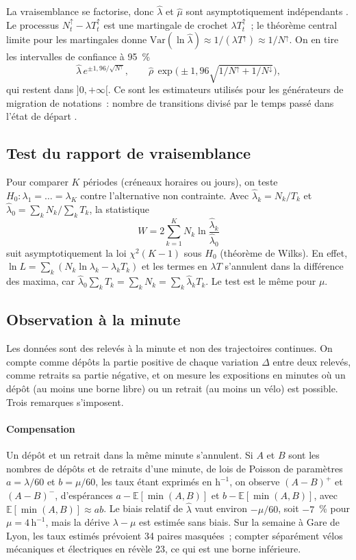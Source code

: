 \documentclass[10pt,a4paper,twocolumn]{article}
\theoremstyle{enonce}
\theoremstyle{defi}
\newcommand{\EE}{\mathbb{E}}
\newcommand{\hr}{\,\mathrm{h}^{-1}}
\newcommand{\Nu}{N^{\uparrow}}
\newcommand{\Nd}{N^{\downarrow}}
\newcommand{\Tu}{T^{\uparrow}}
\begin{document}
La vraisemblance se factorise, donc $\hat\lambda$ et $\hat\mu$ sont asymptotiquement indépendants \cite{Alb62,Bil61}. Le processus $\Nu_t-\lambda\Tu_t$ est une martingale de crochet $\lambda\Tu_t$~; le théorème central limite pour les martingales donne $\mathrm{Var}(\ln\hat\lambda)\approx1/(\lambda\Tu)\approx1/\Nu$. On en tire les intervalles de confiance à 95~\%
\[
\hat\lambda\,e^{\pm1{,}96/\sqrt{\Nu}},\qquad\hat\rho\,\exp\Big(\pm1{,}96\sqrt{1/\Nu+1/\Nd}\Big),
\]
qui restent dans $]0,+\infty[$. Ce sont les estimateurs utilisés pour les générateurs de migration de notations~: nombre de transitions divisé par le temps passé dans l'état de départ \cite{LS02}.

\subsection{Test du rapport de vraisemblance}\label{sec:rv}

Pour comparer $K$ périodes (créneaux horaires ou jours), on teste $H_0:\lambda_1=\dots=\lambda_K$ contre l'alternative non contrainte. Avec $\hat\lambda_k=N_k/T_k$ et $\hat\lambda_0=\sum_kN_k/\sum_kT_k$, la statistique
\[
W=2\sum_{k=1}^KN_k\ln\frac{\hat\lambda_k}{\hat\lambda_0}
\]
suit asymptotiquement la loi $\chi^2(K-1)$ sous $H_0$ (théorème de Wilks). En effet, $\ln L=\sum_k(N_k\ln\lambda_k-\lambda_kT_k)$ et les termes en $\lambda T$ s'annulent dans la différence des maxima, car $\hat\lambda_0\sum_kT_k=\sum_kN_k=\sum_k\hat\lambda_kT_k$. Le test est le même pour $\mu$.

\subsection{Observation à la minute}\label{sec:minute}

Les données sont des relevés à la minute et non des trajectoires continues. On compte comme dépôts la partie positive de chaque variation $\Delta$ entre deux relevés, comme retraits sa partie négative, et on mesure les expositions en minutes où un dépôt (au moins une borne libre) ou un retrait (au moins un vélo) est possible. Trois remarques s'imposent.

\paragraph{Compensation} Un dépôt et un retrait dans la même minute s'annulent. Si $A$ et $B$ sont les nombres de dépôts et de retraits d'une minute, de lois de Poisson de paramètres $a=\lambda/60$ et $b=\mu/60$, les taux étant exprimés en $\mathrm{h}^{-1}$, on observe $(A-B)^+$ et $(A-B)^-$, d'espérances $a-\EE[\min(A,B)]$ et $b-\EE[\min(A,B)]$, avec $\EE[\min(A,B)]\approx ab$. Le biais relatif de $\hat\lambda$ vaut environ $-\mu/60$, soit $-7$~\% pour $\mu=4\hr$, mais la dérive $\lambda-\mu$ est estimée sans biais. Sur la semaine à Gare de Lyon, les taux estimés prévoient 34 paires masquées~; compter séparément vélos mécaniques et électriques en révèle 23, ce qui est une borne inférieure.
\end{document}
